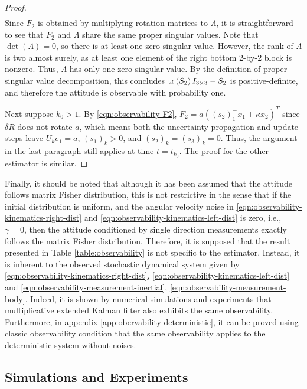 \begin{proof}
\begin{align*}
	\end{align*}
	Since $F_2$ is obtained by multiplying rotation matrices to $\Lambda$, it is straightforward to see that $F_2$ and $\Lambda$ share the same proper singular values. 
	Note that $\det(\Lambda) = 0$, so there is at least one zero singular value.
	However, the rank of $\Lambda$ is two almost surely, as at least one element of the right bottom 2-by-2 block is nonzero.
	Thus, $\Lambda$ has only one zero singular value.
	By the definition of proper singular value decomposition, this concludes $\mathrm{tr}\left( S_2 \right)I_{3\times 3}-S_2$ is positive-definite, and therefore the attitude is observable with probability one.
	
	Next suppose $k_0>1$. By \eqref{eqn:observability-F2}, $F_2 = a((s_2)_1^-x_1+\kappa x_2)^T$ since $\delta R$ does not rotate $a$, which means both the uncertainty propagation and update steps leave $U_ke_1 = a$, $(s_1)_k>0$, and $(s_2)_k=(s_3)_k=0$.
	Thus, the argument in the last paragraph still applies at time $t=t_{k_0}$.
	The proof for the other estimator is similar.
\end{proof}

Finally, it should be noted that although it has been assumed that the attitude follows matrix Fisher distribution, this is not restrictive in the sense that if the initial distribution is uniform, and the angular velocity noise in \eqref{eqn:observability-kinematics-right-dist} and \eqref{eqn:observability-kinematics-left-dist} is zero, i.e., $\gamma=0$, then the attitude conditioned by single direction measurements exactly follows the matrix Fisher distribution.
Therefore, it is supposed that the result presented in Table \ref{table:observability} is not specific to the estimator.
Instead, it is inherent to the observed stochastic dynamical system given by \eqref{eqn:observability-kinematics-right-dist}, \eqref{eqn:observability-kinematics-left-dist} and \eqref{eqn:observability-measurement-inertial}, \eqref{eqn:observability-measurement-body}.
Indeed, it is shown by numerical simulations and experiments that multiplicative extended Kalman filter also exhibits the same observability.
Furthermore, in appendix \ref{app:obervability-deterministic}, it can be proved using classic observability condition that the same observability applies to the deterministic system without noises.

\subsection{Simulations and Experiments}

